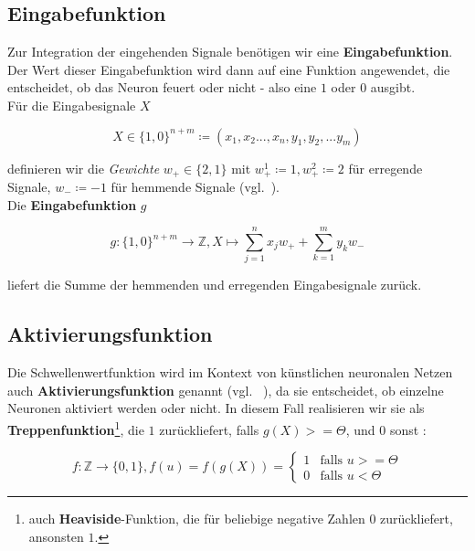 \subsection*{Eingabefunktion}
Zur Integration der eingehenden Signale benötigen wir eine \textbf{Eingabefunktion}.
Der Wert dieser Eingabefunktion wird dann auf eine Funktion angewendet, die entscheidet, ob das Neuron feuert oder nicht - also eine $1$ oder $0$ ausgibt.\\

\noindent
Für die Eingabesignale $X$

\begin{equation}
X \in \{1, 0\}^{n+m} \coloneqq (x_1, x_2 ..., x_n, y_1, y_2, ... y_m)
\end{equation}\linebreak[2]

\noindent
definieren wir die \textit{Gewichte} $w_+ \in \{2, 1\}$ mit $w^1_+ \coloneqq1, w^2_+ \coloneqq 2$ für erregende Signale, $w_- \coloneqq -1$ für hemmende Signale (vgl.~\cite[27-28]{Fau94}).\\


\noindent
Die \textbf{Eingabefunktion} $g$

\begin{equation}
g: \{1, 0\}^{n+m} \to  \mathbb{Z}, X \mapsto \sum^n_{j=1} x_jw_+ + \sum^m_{k=1} y_kw_-
\label{eq:gl-mcpinpfunc}
\end{equation}\linebreak[2]

\noindent
liefert die Summe der hemmenden und erregenden Eingabesignale zurück.


\subsection*{Aktivierungsfunktion}
Die Schwellenwertfunktion wird im Kontext von künstlichen neuronalen Netzen auch \textbf{Aktivierungsfunktion} genannt (vgl. ~\cite[847]{RN09}), da sie entscheidet, ob einzelne Neuronen aktiviert werden oder nicht. In diesem Fall realisieren wir sie als \textbf{Treppenfunktion}\footnote{
    auch \textbf{Heaviside}-Funktion, die für beliebige negative Zahlen $0$ zurückliefert, ansonsten $1$.
}, die $1$ zurückliefert, falls $g(X) >= \Theta$, und $0$ sonst :

\begin{equation}
f:  \mathbb{Z} \to \{0, 1\}, f(u) = f(g(X)) = \begin{cases}
                                          1  &\text{falls } u >= \Theta \\
                                          0 &\text{falls } u < \Theta
\end{cases}
\label{eq:gl-activation}
\end{equation}\linebreak[2]

